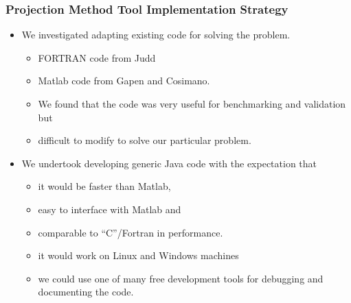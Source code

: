 \documentclass[tikz]{beamer}
\begin{document}
\begin{frame}
  \frametitle{Projection Method Tool Implementation Strategy}

\begin{itemize}
\item We investigated adapting existing code for solving the problem.
  \begin{itemize}
\item FORTRAN code from Judd 
\item  Matlab code from Gapen and Cosimano. 
\item We found that the code was very useful for benchmarking and validation but \item difficult to modify to solve our particular problem.
\end{itemize}
  \end{itemize}

\begin{itemize}
\item We undertook developing generic Java code with the expectation that 
  \begin{itemize}
  \item 
it would be faster than Matlab,
\item easy to interface with Matlab and
\item  comparable to ``C''/Fortran in performance.
\item it would work on Linux and Windows machines
\item we could use one of many free development tools 
for debugging and documenting the code.
  \end{itemize}
\end{itemize}



\end{frame}

  
\end{document}
